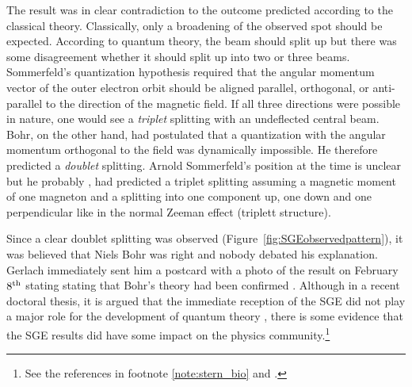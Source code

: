 \documentclass{article}
\begin{document}
The result was in clear contradiction to the outcome predicted according to the classical theory. Classically, only a broadening of the observed spot should be expected. According to quantum theory, the beam should split up but there was some disagreement whether it should split up into two or three beams. Sommerfeld's quantization hypothesis required that the angular momentum vector of the outer electron orbit should be aligned parallel, orthogonal, or anti-parallel to the direction of the magnetic field. If all three directions were possible in nature, one would see a \emph{triplet} splitting with an undeflected central beam. Bohr, on the other hand, had postulated that a quantization with the angular momentum orthogonal to the field was dynamically impossible. He therefore predicted a \emph{doublet} splitting. Arnold Sommerfeld's position at the time is unclear but he probably \citep{SommerfeldA1920Zahlenmysterium,SommerfeldA1920Gesetze}, \cite[p.~541]{SommerfeldA1921Atombau2} had predicted a triplet splitting assuming a magnetic moment of one magneton and a splitting into one component up, one down and one perpendicular like in the normal Zeeman effect (triplett structure). 

Since a clear doublet splitting was observed (Figure~\ref{fig:SGEobservedpattern}), it was believed that Niels Bohr was right and nobody debated his explanation. Gerlach immediately sent him a postcard with a photo of the result on February $8^{\rm th}$ stating stating that Bohr's theory had been confirmed \citep{GerlachW1969Stern,GerlachW1969Entdeckung,FriedrichBEtal2003Stern}. Although in a recent doctoral thesis, it is argued that the immediate reception of the SGE did not play a major role for the development of quantum theory \citep{Pie2015Experiment}, there is some evidence that the SGE results did have some impact on the physics community.\footnote{See the references in footnote \ref{note:stern_bio} and \citep{GerlachW1969Stern}.} 
\end{document}
